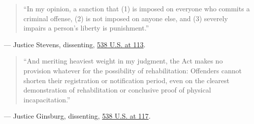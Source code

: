 \documentclass[12pt]{article}
\begin{document}
\begin{quote}
``In my opinion, a sanction that (1) is imposed on everyone who commits a criminal offense, (2) is not imposed on anyone else, and (3) severely impairs a person's liberty is punishment.''
\end{quote}
\noindent --- Justice Stevens, dissenting, \href{https://www.law.cornell.edu/supct/html/01-729.ZD.html}{538 U.S. at 113}.

\begin{quote}
``And meriting heaviest weight in my judgment, the Act makes no provision whatever for the possibility of rehabilitation: Offenders cannot shorten their registration or notification period, even on the clearest demonstration of rehabilitation or conclusive proof of physical incapacitation.''
\end{quote}
\noindent --- Justice Ginsburg, dissenting, \href{https://www.law.cornell.edu/supct/html/01-729.ZD1.html}{538 U.S. at 117}.
\end{document}
